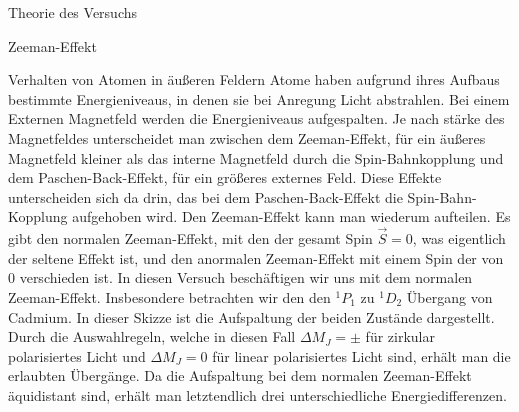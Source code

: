 \documentclass[pdftex, a4paper,11pt, twoside, ngerman]{report}
\begin{document}
  \begin{chapter}{Theorie des Versuchs}
    \label{chp:Theorie}
    
    
    
    \begin{section}{Zeeman-Effekt}
      
      
      
      \begin{subsection}{Verhalten von Atomen in äußeren Feldern}
        Atome haben aufgrund ihres Aufbaus bestimmte Energieniveaus,
        in denen sie bei Anregung Licht abstrahlen. 
        Bei einem Externen Magnetfeld werden die Energieniveaus aufgespalten. 
        Je nach stärke des Magnetfeldes unterscheidet man zwischen dem
        Zeeman-Effekt, für ein äußeres Magnetfeld kleiner als das interne
        Magnetfeld durch die Spin-Bahnkopplung und dem Paschen-Back-Effekt,
        für ein größeres externes Feld. Diese Effekte unterscheiden sich da
        drin, das bei dem Paschen-Back-Effekt die Spin-Bahn-Kopplung aufgehoben
        wird. Den Zeeman-Effekt kann man wiederum aufteilen. Es gibt den
        normalen Zeeman-Effekt, mit den der gesamt Spin $\vec S = 0$, was
        eigentlich der seltene Effekt ist, und den anormalen Zeeman-Effekt mit
        einem Spin der von 0 verschieden ist. \newline
        In diesen Versuch beschäftigen wir uns mit dem normalen Zeeman-Effekt.
        Insbesondere betrachten wir den den ${}^1P_1$ zu ${}^1D_2$ Übergang von
        Cadmium. In dieser Skizze ist die Aufspaltung der beiden Zustände
        dargestellt. Durch die Auswahlregeln, welche in diesen Fall
        $\Delta M_J = \pm$ für zirkular polarisiertes Licht und $\Delta M_J=0$
        für linear polarisiertes Licht sind, erhält man die erlaubten Übergänge.
        Da die Aufspaltung bei dem normalen Zeeman-Effekt äquidistant sind,
        erhält man letztendlich drei unterschiedliche Energiedifferenzen.
        

\end{subsection}
\end{section}
\end{chapter}
\end{document}
